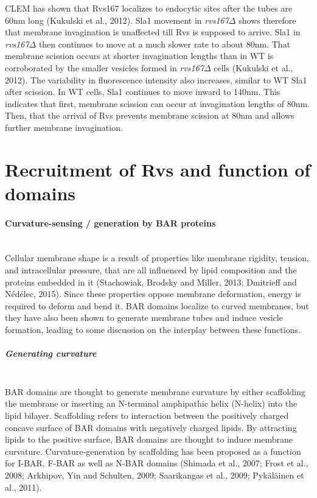 \newpage
CLEM has shown that Rvs167 localizes to endocytic sites after the tubes are 60nm long (Kukulski et al., 2012). Sla1 movement in \textit{rvs167$\Delta$} shows therefore that membrane invagination is unaffected till Rvs is supposed to arrive. Sla1 in \textit{rvs167$\Delta$} then continues to move at a much slower rate to about 80nm. That membrane scission occurs at shorter invagination lengths than in WT is corroborated by the smaller vesicles formed in \textit{rvs167$\Delta$} cells (Kukulski et al., 2012).  The variability in fluorescence intensity also increases, similar to WT Sla1 after scission. In WT cells, Sla1 continues to move inward to 140nm. This indicates that first, membrane scission can occur at invagination lengths of 80nm. Then, that the arrival of Rvs prevents membrane scission at 80nm  and allows further membrane invagination. 




\newpage
\section{Recruitment of Rvs and function of \\domains} 
\label{scaffolding_rvs}
	\paragraph{Curvature-sensing / generation by BAR proteins }
					\mbox{}\\
Cellular membrane shape is a result of properties like membrane rigidity, tension, and intracellular pressure, that are all influenced by lipid composition and the proteins embedded in it (Stachowiak, Brodsky and Miller, 2013; Dmitrieff and Nédélec, 2015). Since these properties oppose membrane deformation, energy is required to deform and bend it. BAR domains localize to curved membranes, but they have also been shown to generate membrane tubes and induce vesicle formation, leading to some discussion on the interplay between these functions. 


	\vspace{5mm}
			
				\subparagraph{Generating curvature }
				\mbox{}\\
BAR domains are thought to generate membrane curvature by either scaffolding the membrane or inserting an N-terminal amphipathic helix (N-helix) into the lipid bilayer. 
Scaffolding refers to interaction between the positively charged concave surface of BAR domains with negatively charged lipids. By attracting lipids to the positive surface, BAR domains are thought to induce membrane curvature. Curvature-generation by scaffolding has been proposed as a function for I-BAR, F-BAR as well as N-BAR domains (Shimada et al., 2007; Frost et al., 2008; Arkhipov, Yin and Schulten, 2009; Saarikangas et al., 2009; Pykäläinen et al., 2011). 
	\vspace{5mm}
	
